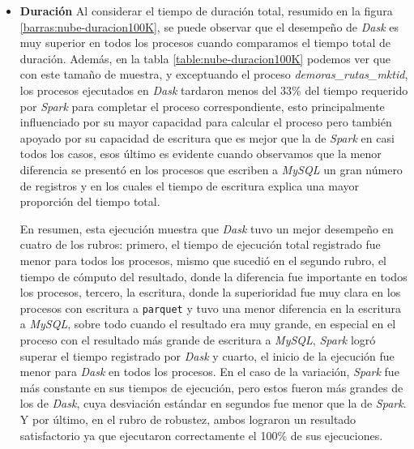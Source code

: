 \begin{itemize}
	\item \textbf{Duración} Al considerar el tiempo de duración total, resumido en la figura \ref{barras:nube-duracion100K}, se puede observar que el desempeño de \textit{Dask} es muy superior en todos los procesos cuando comparamos el tiempo total de duración. Además, en la tabla \ref{table:nube-duracion100K} podemos ver que con este tamaño de muestra, y exceptuando el proceso \textit{demoras\_rutas\_mktid}, los procesos ejecutados en \textit{Dask} tardaron menos del 33\% del tiempo requerido por \textit{Spark} para completar el proceso correspondiente, esto principalmente influenciado por su mayor capacidad para calcular el proceso pero también apoyado por su capacidad de escritura que es mejor que la de \textit{Spark} en casi todos los casos, esos último es evidente cuando observamos que la menor diferencia se presentó en los procesos que escriben a \textit{MySQL} un gran número de registros y en los cuales el tiempo de escritura explica una mayor proporción del tiempo total.
	
En resumen, esta ejecución muestra que \textit{Dask} tuvo un mejor desempeño en cuatro de los rubros: primero, el tiempo de ejecución total registrado fue menor para todos los procesos, mismo que sucedió en el segundo rubro, el tiempo de cómputo del resultado, donde la diferencia fue importante en todos los procesos, tercero, la escritura, donde la superioridad fue muy clara en los procesos con escritura a \texttt{parquet} y tuvo una menor diferencia en la escritura a \textit{MySQL}, sobre todo cuando el resultado era muy grande, en especial en el proceso con el resultado más grande de escritura a \textit{MySQL}, \textit{Spark} logró superar el tiempo registrado por \textit{Dask} y cuarto, el inicio de la ejecución fue menor para \textit{Dask} en todos los procesos. En el caso de la variación, \textit{Spark} fue más constante en sus tiempos de ejecución, pero estos fueron más grandes de los de \textit{Dask}, cuya desviación estándar en segundos fue menor que la de \textit{Spark}. Y por último, en el rubro de robustez, ambos lograron un resultado satisfactorio ya que ejecutaron correctamente el 100\% de sus ejecuciones.
	
\end{itemize}


